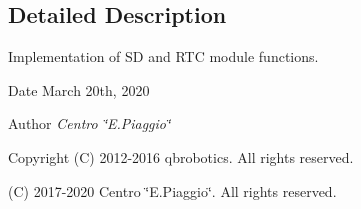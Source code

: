 \subsection{Detailed Description}
Implementation of SD and R\+TC module functions. 

\begin{DoxyDate}{Date}
March 20th, 2020 
\end{DoxyDate}
\begin{DoxyAuthor}{Author}
{\itshape Centro \char`\"{}\+E.\+Piaggio\char`\"{}} 
\end{DoxyAuthor}
\begin{DoxyCopyright}{Copyright}
(C) 2012-\/2016 qbrobotics. All rights reserved. 

(C) 2017-\/2020 Centro \char`\"{}\+E.\+Piaggio\char`\"{}. All rights reserved. 
\end{DoxyCopyright}
